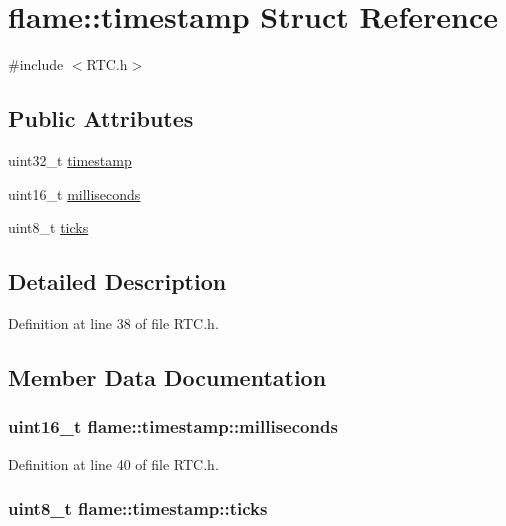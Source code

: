 \hypertarget{structflame_1_1timestamp}{\section{flame\-:\-:timestamp Struct Reference}
\label{structflame_1_1timestamp}
}


{\ttfamily \#include $<$R\-T\-C.\-h$>$}

\subsection*{Public Attributes}
\begin{DoxyCompactItemize}
\item 
uint32\-\_\-t \hyperlink{structflame_1_1timestamp_a63da2e5e29c20d05ed80cab77b635399}{timestamp}
\item 
uint16\-\_\-t \hyperlink{structflame_1_1timestamp_aee5370df09d8e2e1f3d6b4a4b0dd3468}{milliseconds}
\item 
uint8\-\_\-t \hyperlink{structflame_1_1timestamp_ab16901573a9459f1adca134abed1efa9}{ticks}
\end{DoxyCompactItemize}


\subsection{Detailed Description}


Definition at line 38 of file R\-T\-C.\-h.



\subsection{Member Data Documentation}
\hypertarget{structflame_1_1timestamp_aee5370df09d8e2e1f3d6b4a4b0dd3468}{
\subsubsection[{milliseconds}]{\setlength{\rightskip}{0pt plus 5cm}uint16\-\_\-t flame\-::timestamp\-::milliseconds}}\label{structflame_1_1timestamp_aee5370df09d8e2e1f3d6b4a4b0dd3468}


Definition at line 40 of file R\-T\-C.\-h.

\hypertarget{structflame_1_1timestamp_ab16901573a9459f1adca134abed1efa9}{
\subsubsection[{ticks}]{\setlength{\rightskip}{0pt plus 5cm}uint8\-\_\-t flame\-::timestamp\-::ticks}}\label{structflame_1_1timestamp_ab16901573a9459f1adca134abed1efa9}


